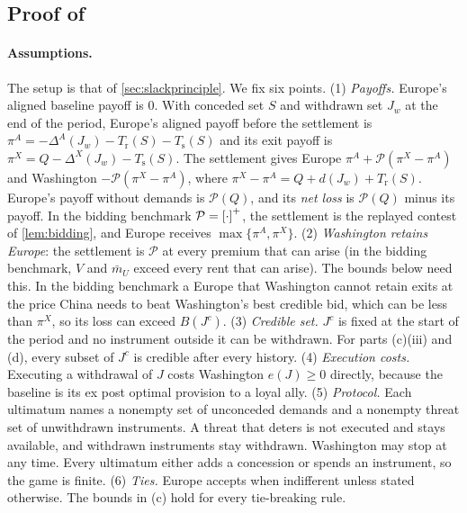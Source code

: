 \subsection{Proof of \texorpdfstring{}{the slack principle}}

\paragraph{Assumptions.} The setup is that of \cref{sec:slackprinciple}. We fix six points. (1) \emph{Payoffs.} Europe's aligned baseline payoff is $0$. With conceded set $S$ and withdrawn set $J_w$ at the end of the period, Europe's aligned payoff before the settlement is $\pi^A=-\Delta^A(J_w)-T_{\mathrm r}(S)-T_{\mathrm s}(S)$ and its exit payoff is $\pi^X=Q-\Delta^X(J_w)-T_{\mathrm s}(S)$. The settlement gives Europe $\pi^A+\mathcal P(\pi^X-\pi^A)$ and Washington $-\mathcal P(\pi^X-\pi^A)$, where $\pi^X-\pi^A=Q+d(J_w)+T_{\mathrm r}(S)$. Europe's payoff without demands is $\mathcal P(Q)$, and its \emph{net loss} is $\mathcal P(Q)$ minus its payoff. In the bidding benchmark $\mathcal P=\left[\cdot\right]^{+}$, the settlement is the replayed contest of \cref{lem:bidding}, and Europe receives $\max\{\pi^A,\pi^X\}$. (2) \emph{Washington retains Europe}: the settlement is $\mathcal P$ at every premium that can arise (in the bidding benchmark, $V$ and $\bar m_U$ exceed every rent that can arise). The bounds below need this. In the bidding benchmark a Europe that Washington cannot retain exits at the price China needs to beat Washington's best credible bid, which can be less than $\pi^X$, so its loss can exceed $B(J^c)$. (3) \emph{Credible set.} $J^c$ is fixed at the start of the period and no instrument outside it can be withdrawn. For parts (c)(iii) and (d), every subset of $J^c$ is credible after every history. (4) \emph{Execution costs.} Executing a withdrawal of $J$ costs Washington $e(J)\ge 0$ directly, because the baseline is its ex post optimal provision to a loyal ally. (5) \emph{Protocol.} Each ultimatum names a nonempty set of unconceded demands and a nonempty threat set of unwithdrawn instruments. A threat that deters is not executed and stays available, and withdrawn instruments stay withdrawn. Washington may stop at any time. Every ultimatum either adds a concession or spends an instrument, so the game is finite. (6) \emph{Ties.} Europe accepts when indifferent unless stated otherwise. The bounds in (c) hold for every tie-breaking rule.

